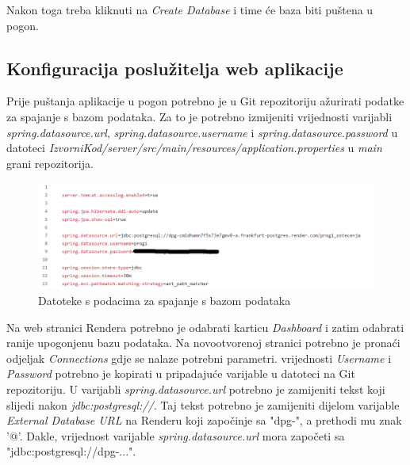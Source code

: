 			Nakon toga treba kliknuti na \textit{Create Database} i time će baza biti puštena u pogon.
			
			\subsection{Konfiguracija poslužitelja web aplikacije}
			
			Prije puštanja aplikacije u pogon potrebno je u Git repozitoriju ažurirati podatke za spajanje s bazom podataka. Za to je potrebno izmijeniti vrijednosti varijabli \textit{spring.datasource.url}, \textit{spring.datasource.username} i \textit{spring.datasource.password} u datoteci \textit{IzvorniKod/server/src/main/resources/application.properties} u \textit{main} grani repozitorija. 
			
			\begin{figure}[H]
				\includegraphics[width=\textwidth]{slike/upute/applicationProperties.png} %
				\caption{Datoteke s podacima za spajanje s bazom podataka}
				\label{fig:applicationProperties} %
			\end{figure}
			
			Na web stranici Rendera potrebno je odabrati karticu \textit{Dashboard} i zatim odabrati ranije upogonjenu bazu podataka. Na novootvorenoj stranici potrebno je pronaći odjeljak \textit{Connections} gdje se nalaze potrebni parametri. vrijednosti \textit{Username} i \textit{Password} potrebno je kopirati u pripadajuće varijable u datoteci na Git repozitoriju. U varijabli \textit{spring.datasource.url} potrebno je zamijeniti tekst koji slijedi nakon \textit{jdbc:postgresql://}. Taj tekst potrebno je zamijeniti dijelom varijable \textit{External Database URL} na Renderu koji započinje sa "dpg-", a prethodi mu znak '@'. Dakle, vrijednost varijable \textit{spring.datasource.url} mora započeti sa "jdbc:postgresql://dpg-...".
			
